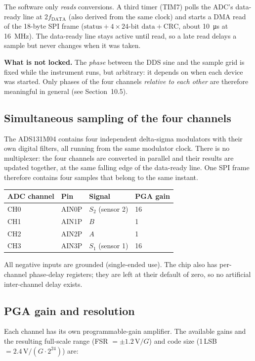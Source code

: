 \documentclass[11pt,a4paper]{article}
\begin{document}
The software only \emph{reads} conversions.  A third timer (TIM7) polls the
ADC's data-ready line at $2f_{\mathrm{DATA}}$ (also derived from the same
clock) and starts a DMA read of the 18-byte SPI frame
($\text{status}+4\times\text{24-bit data}+\text{CRC}$, about \SI{10}{\micro\second}
at \SI{16}{\mega\hertz}).  The data-ready line stays active until read, so a
late read delays a sample but never changes when it was taken.

\textbf{What is not locked.}  The \emph{phase} between the DDS sine and the
sample grid is fixed while the instrument runs, but arbitrary: it depends on
when each device was started.  Only phases of the four channels
\emph{relative to each other} are therefore meaningful in general (see
Section~10.5).

\subsection{Simultaneous sampling of the four channels}

The ADS131M04 contains four independent delta-sigma modulators with their
own digital filters, all running from the same modulator clock.  There is no
multiplexer: the four channels are converted in parallel and their results
are updated together, at the same falling edge of the data-ready line.  One
SPI frame therefore contains four samples that belong to the same instant.

\begin{center}
\begin{tabular}{@{}llll@{}}
\toprule
ADC channel & Pin & Signal & PGA gain \\
\midrule
CH0 & AIN0P & $S_2$ (sensor 2) & 16 \\
CH1 & AIN1P & $B$ & 1 \\
CH2 & AIN2P & $A$ & 1 \\
CH3 & AIN3P & $S_1$ (sensor 1) & 16 \\
\bottomrule
\end{tabular}
\end{center}
All negative inputs are grounded (single-ended use).  The chip also has
per-channel phase-delay registers; they are left at their default of zero,
so no artificial inter-channel delay exists.

\subsection{PGA gain and resolution}

Each channel has its own programmable-gain amplifier.  The available gains
and the resulting full-scale range (FSR $=\pm1.2\,\mathrm{V}/G$) and code size
(1\,LSB $=2.4\,\mathrm{V}/(G\cdot 2^{24})$) are:
\end{document}
